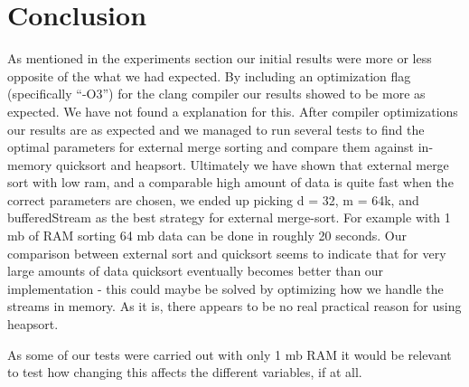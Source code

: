 \section{Conclusion}
As mentioned in the experiments section our initial results were more or less opposite of the what we had expected. By including an optimization flag (specifically ``-O3'') for the clang compiler our results showed to be more as expected. We have not found a explanation for this.
After compiler optimizations our results are as expected and we managed to run several tests to find the optimal parameters for external merge sorting and compare them against in-memory quicksort and heapsort. Ultimately we have shown that external merge sort with low ram, and a comparable high amount of data is quite fast when the correct parameters are chosen, we ended up picking d = 32, m = 64k, and bufferedStream as the best strategy for external merge-sort.  For example with 1 mb of RAM sorting 64 mb data can be done in roughly 20 seconds.
Our comparison between external sort and quicksort seems to indicate that for very large amounts of data quicksort eventually becomes better than our implementation - this could maybe be solved by optimizing how we handle the streams in memory. As it is, there appears to be no real practical reason for using heapsort.

As some of our tests were carried out with only 1 mb RAM it would be relevant to test how changing this affects the different variables, if at all.